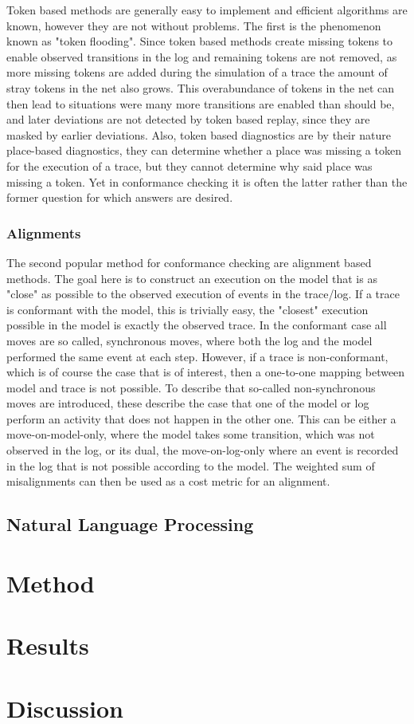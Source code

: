 \documentclass[runningheads]{template/llncs}
\begin{document}
Token based methods are generally easy to implement and efficient algorithms are known, however they are not without problems.
The first is the phenomenon known as "token flooding". Since token based methods create missing tokens to enable observed transitions in the log and remaining tokens are not removed, as more missing tokens are added during the simulation of a trace the  amount of stray tokens in the net also grows.
This overabundance of tokens in the net can then lead to situations were many more transitions are enabled than should be, and later deviations are not detected by token based replay, since they are masked by earlier deviations.
Also, token based diagnostics are  by their nature place-based diagnostics, they can determine whether a place was missing a token for the execution of a trace, but they cannot determine why said place was missing a token. 
Yet in conformance checking it is often the latter rather than the former question for which answers are desired. 

\subsubsection{Alignments}

The second popular method for conformance checking are alignment based methods.
The goal here is to construct an execution on the model that is as "close" as possible to the observed execution of events in the trace/log.
If a trace is conformant with the model, this is trivially easy, the "closest" execution possible in the model is exactly the observed trace.
In the conformant case all moves are so called, synchronous moves, where both the log and the model performed the same event at each step.
However, if a trace is non-conformant, which is of course the case that is of interest, then a one-to-one mapping between model and trace is not possible.
To describe that so-called non-synchronous moves are introduced, these describe the case that one of  the model or log perform an activity that does not happen in the other one.
This can be either a move-on-model-only, where the model takes some transition, which was not observed in the log, or its dual, the move-on-log-only where an event is recorded in the log that is not possible according to the model.
The weighted sum of misalignments can then be used as a cost metric for an alignment. 

\subsection{Natural Language Processing}

\section{Method}

\section{Results}

\section{Discussion}

%
%
%


%
\end{document}
